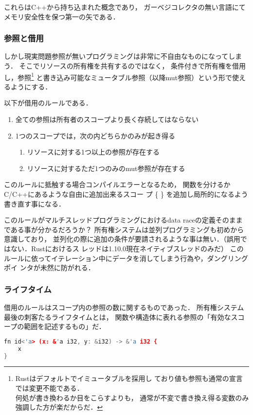 これらはC++から持ち込まれた概念であり，
ガーベジコレクタの無い言語にてメモリ安全性を保つ第一の矢である．

\subsubsection{参照と借用}
しかし現実問題参照が無いプログラミングは非常に不自由なものになってしまう．
そこでリソースの所有権を共有するのではなく，
条件付きで所有権を借用し，参照\footnote{Rustはデフォルトでイミュータブルを採用し
  ており値も参照も通常の宣言では変更不能である．\\
  何処が書き換わるか目をこらすよりも，
  通常が不変で書き換え得る変数のみ強調した方が楽だからだ．
}
と書き込み可能なミュータブル参照（以降mut参照）という形で使えるようにする．

以下が借用のルールである．
\begin{enumerate}
  \item 全ての参照は所有者のスコープより長く存続してはならない
  \item 1つのスコープでは，次の内どちらかのみが起き得る
    \begin{enumerate}
      \item リソースに対する1つ以上の参照が存在する
      \item リソースに対するただ1つのみのmut参照が存在する
    \end{enumerate}
\end{enumerate}
このルールに抵触する場合コンパイルエラーとなるため，
関数を分けるかC/C++にあるような自由に追加出来るスコー
プ \{ \} を追加し局所的になるよう書き直す事になる．

このルールがマルチスレッドプログラミングにおけるdata raceの定義そのままである事が分かるだろうか？
所有権システムは並列プログラミングも初めから意識しており，
並列化の際に追加の条件が要請されるような事は無い．（誤用ではない．Rustにおけるス
レッドは1.10.0現在ネイティブスレッドのみだ）
このルールに依ってイテレーション中にデータを消してしまう行為や，ダングリングポイ
ンタが未然に防がれる．

\subsubsection{ライフタイム}
借用のルールはスコープ内の参照の数に関するものであった．
所有権システム最後の刺客たるライフタイムとは，
関数や構造体に表れる参照の「有効なスコープの範囲を記述するもの」だ．

\begin{lstlisting}[language={C++},caption=関数のライフタイム,label=lifetime_fn]
fn id<'a> (x: &'a i32, y: &i32) -> &'a i32 {
    x
}
\end{lstlisting}


